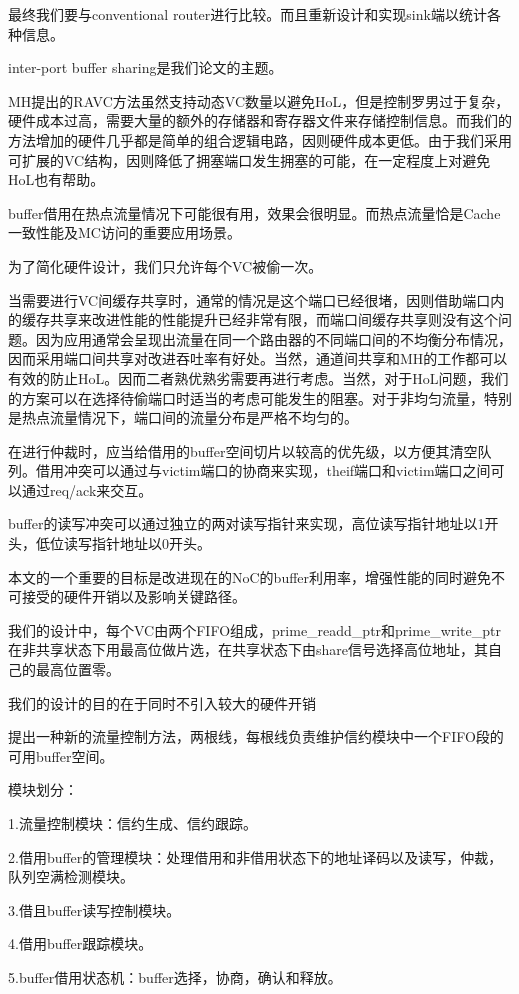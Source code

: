 \documentclass[10pt,journal]{IEEEtran}
\begin{document}
最终我们要与conventional router进行比较。而且重新设计和实现sink端以统计各种信息。

inter-port buffer sharing是我们论文的主题。

MH提出的RAVC方法虽然支持动态VC数量以避免HoL，但是控制罗男过于复杂，硬件成本过高，需要大量的额外的存储器和寄存器文件来存储控制信息。而我们的方法增加的硬件几乎都是简单的组合逻辑电路，因则硬件成本更低。由于我们采用可扩展的VC结构，因则降低了拥塞端口发生拥塞的可能，在一定程度上对避免HoL也有帮助。

buffer借用在热点流量情况下可能很有用，效果会很明显。而热点流量恰是Cache一致性能及MC访问的重要应用场景。

为了简化硬件设计，我们只允许每个VC被偷一次。

当需要进行VC间缓存共享时，通常的情况是这个端口已经很堵，因则借助端口内的缓存共享来改进性能的性能提升已经非常有限，而端口间缓存共享则没有这个问题。因为应用通常会呈现出流量在同一个路由器的不同端口间的不均衡分布情况，因而采用端口间共享对改进吞吐率有好处。当然，通道间共享和MH的工作都可以有效的防止HoL。因而二者熟优熟劣需要再进行考虑。当然，对于HoL问题，我们的方案可以在选择待偷端口时适当的考虑可能发生的阻塞。对于非均匀流量，特别是热点流量情况下，端口间的流量分布是严格不均匀的。

在进行仲裁时，应当给借用的buffer空间切片以较高的优先级，以方便其清空队列。借用冲突可以通过与victim端口的协商来实现，theif端口和victim端口之间可以通过req/ack来交互。

buffer的读写冲突可以通过独立的两对读写指针来实现，高位读写指针地址以1开头，低位读写指针地址以0开头。

本文的一个重要的目标是改进现在的NoC的buffer利用率，增强性能的同时避免不可接受的硬件开销以及影响关键路径。

我们的设计中，每个VC由两个FIFO组成，prime\_readd\_ptr和prime\_write\_ptr在非共享状态下用最高位做片选，在共享状态下由share信号选择高位地址，其自己的最高位置零。

我们的设计的目的在于同时不引入较大的硬件开销

提出一种新的流量控制方法，两根线，每根线负责维护信约模块中一个FIFO段的可用buffer空间。

模块划分：

1.流量控制模块：信约生成、信约跟踪。

2.借用buffer的管理模块：处理借用和非借用状态下的地址译码以及读写，仲裁，队列空满检测模块。

3.借且buffer读写控制模块。

4.借用buffer跟踪模块。

5.buffer借用状态机：buffer选择，协商，确认和释放。
\end{document}
